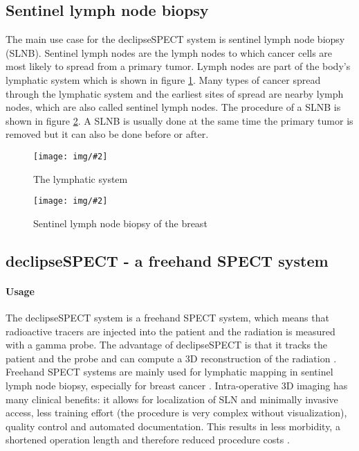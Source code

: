 \documentclass{scrartcl}
\newcommand{\red}[1]{{\color{red} #1}}
\newcommand{\graphic}[3][width=\linewidth] %
{
  \begin{figure}[h!t]
    \centering
    \texttt{[image: img/\#2]}
    \caption{#3}
    \label{fig:#2}
  \end{figure}
}
\newcommand{\refFigure}[1]{figure \ref{fig:#1}}
\begin{document}
\subsection{Sentinel lymph node biopsy}
The main use case for the declipseSPECT system is sentinel lymph node biopsy (SLNB). Sentinel lymph nodes are the lymph nodes to which cancer cells are most likely to spread from a primary tumor. Lymph nodes are part of the body's lymphatic system which is shown in \refFigure{lymphatic-system}. Many types of cancer spread through the lymphatic system and the earliest sites of spread are nearby lymph nodes, which are also called sentinel lymph nodes.
The procedure of a SLNB is shown in \refFigure{slnb}. A SLNB is usually done at the same time the primary tumor is removed but it can also be done before or after.
\graphic[scale=.7]{lymphatic-system}{The lymphatic system \cite{bupa}}
\graphic[scale=.7]{slnb}{Sentinel lymph node biopsy of the breast \cite{cancer}}


\subsection{declipseSPECT - a freehand SPECT system}
\paragraph*{Usage}
The declipseSPECT system is a freehand SPECT system, which means that radioactive tracers are injected into the patient and the radiation is measured with a gamma probe. The advantage of declipseSPECT is that it tracks the patient and the probe and can compute a 3D reconstruction of the radiation \cite{wendler}.
Freehand SPECT systems are mainly used for lymphatic mapping in sentinel lymph node biopsy, especially for breast cancer \cite{buck}. Intra-operative 3D imaging has many clinical benefits: it allows for localization of SLN and minimally invasive access, less training effort (the procedure is very complex without visualization), quality control and automated documentation. This results in less morbidity, a shortened operation length and therefore reduced procedure costs \cite{surgiceye}.
\end{document}
